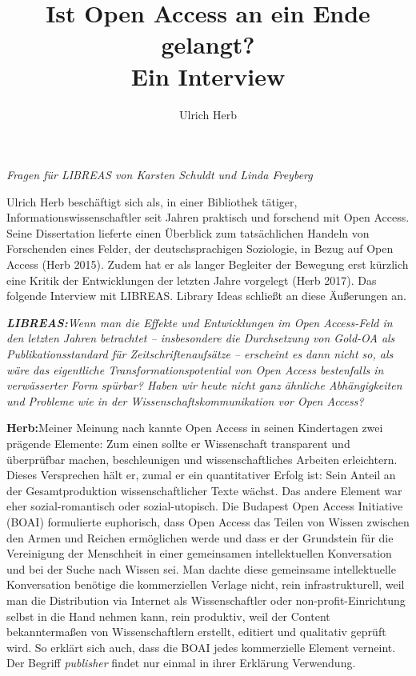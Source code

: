 \documentclass[a4paper,
fontsize=11pt,
oneside,
numbers=noperiodatend,
parskip=half-,
bibliography=totoc,
final
]{scrartcl}
\title{\LARGE{Ist Open Access an ein Ende gelangt? \\ Ein Interview}} %
\author{Ulrich Herb} %
\date{}
\begin{document}
\maketitle
\thispagestyle{fancyplain} 


\emph{Fragen für LIBREAS von Karsten Schuldt und Linda Freyberg}

Ulrich Herb beschäftigt sich als, in einer Bibliothek tätiger,
Informationswissenschaftler seit Jahren praktisch und forschend mit Open
Access. Seine Dissertation lieferte einen Überblick zum tatsächlichen
Handeln von Forschenden eines Felder, der deutschsprachigen Soziologie,
in Bezug auf Open Access (Herb 2015). Zudem hat er als langer Begleiter
der Bewegung erst kürzlich eine Kritik der Entwicklungen der letzten
Jahre vorgelegt (Herb 2017). Das folgende Interview mit LIBREAS. Library
Ideas schließt an diese Äußerungen an.

\emph{\textbf{LIBREAS:}Wenn man die Effekte und Entwicklungen im Open
Access-Feld in den letzten Jahren betrachtet -- insbesondere die
Durchsetzung von Gold-OA als Publikationsstandard für
Zeitschriftenaufsätze -- erscheint es dann nicht so, als wäre das
eigentliche Transformationspotential von Open Access bestenfalls in
verwässerter Form spürbar? Haben wir heute nicht ganz ähnliche
Abhängigkeiten und Probleme wie in der Wissenschaftskommunikation vor
Open Access?}

\textbf{Herb:}Meiner Meinung nach kannte Open Access in seinen
Kindertagen zwei prägende Elemente: Zum einen sollte er Wissenschaft
transparent und überprüfbar machen, beschleunigen und wissenschaftliches
Arbeiten erleichtern. Dieses Versprechen hält er, zumal er ein
quantitativer Erfolg ist: Sein Anteil an der Gesamtproduktion
wissenschaftlicher Texte wächst. Das andere Element war eher
sozial-romantisch oder sozial-utopisch. Die Budapest Open Access
Initiative (BOAI) formulierte euphorisch, dass Open Access das Teilen
von Wissen zwischen den Armen und Reichen ermöglichen werde und dass er
der Grundstein für die Vereinigung der Menschheit in einer gemeinsamen
intellektuellen Konversation und bei der Suche nach Wissen sei. Man
dachte diese gemeinsame intellektuelle Konversation benötige die
kommerziellen Verlage nicht, rein infrastrukturell, weil man die
Distribution via Internet als Wissenschaftler oder
non-profit-Einrichtung selbst in die Hand nehmen kann, rein produktiv,
weil der Content bekanntermaßen von Wissenschaftlern erstellt, editiert
und qualitativ geprüft wird. So erklärt sich auch, dass die BOAI jedes
kommerzielle Element verneint. Der Begriff \emph{publisher} findet nur
einmal in ihrer Erklärung Verwendung.
\end{document}
